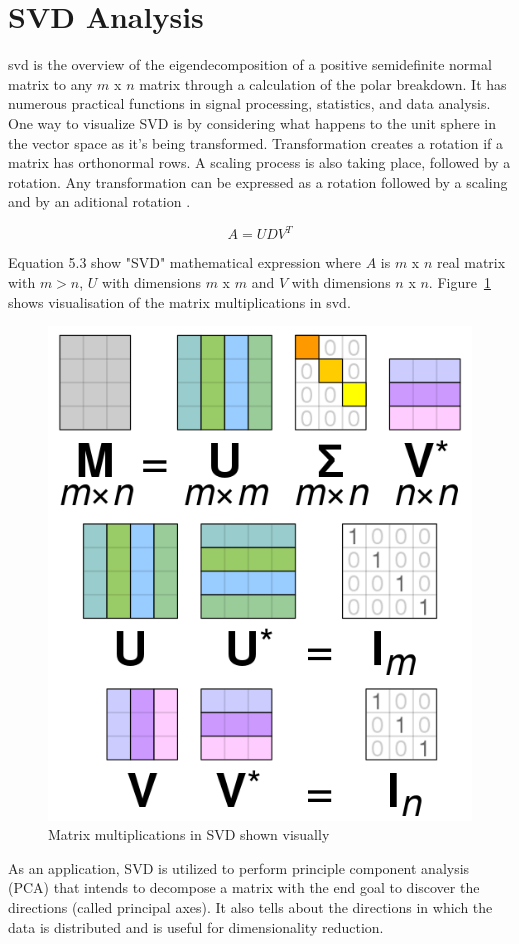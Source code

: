 \section{SVD Analysis}

\gls{svd} is the overview of the eigendecomposition of a positive semidefinite normal matrix to any $m$ x $n$ matrix through a calculation of the polar breakdown. It has numerous practical functions in signal processing, statistics, and data analysis.
One way to visualize SVD is by considering what happens to the unit sphere in the vector space as it’s being transformed. Transformation creates a rotation if a matrix has orthonormal rows. A scaling process is also taking place, followed by a rotation. Any transformation can be expressed as a rotation followed by a scaling and by an aditional rotation \cite{SVD}.

\begin{equation} \label{eq:svd_formula}
 A = UDV^{T}
\end{equation}

Equation 5.3 show "SVD" mathematical expression where $A$ is $m$ x $n$ real matrix with $m>n$, $U$ with dimensions $m$ x $m$ and $V$ with dimensions $n$ x $n$. Figure~\ref{fig:svd_matrix} shows visualisation of the matrix multiplications in \gls{svd}.

    \begin{figure}[H]
            \centering
            \includegraphics[width=0.5\linewidth]{figures/ch5/svd_matrix.png}
            \caption{\label{fig:svd_matrix} Matrix multiplications in SVD shown visually \cite{SVD}}
    \end{figure}

As an application, SVD is utilized to perform principle component analysis (PCA) that intends to decompose a matrix with the end goal to discover the directions (called principal axes). It also tells about the directions in which the data is distributed and is useful for dimensionality reduction. 

